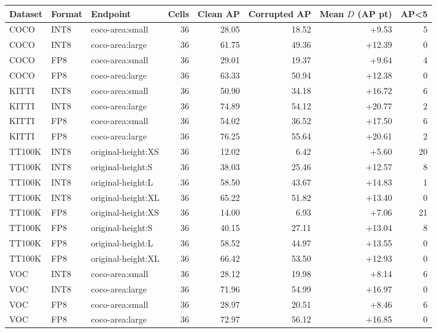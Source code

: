 \begin{tabular}{lllrrrrr}
\toprule
Dataset & Format & Endpoint & Cells & Clean AP & Corrupted AP & Mean $D$ (AP pt) & AP<5 \\
\midrule
COCO & INT8 & coco-area:small & 36 & 28.05 & 18.52 & +9.53 & 5 \\
COCO & INT8 & coco-area:large & 36 & 61.75 & 49.36 & +12.39 & 0 \\
COCO & FP8 & coco-area:small & 36 & 29.01 & 19.37 & +9.64 & 4 \\
COCO & FP8 & coco-area:large & 36 & 63.33 & 50.94 & +12.38 & 0 \\
KITTI & INT8 & coco-area:small & 36 & 50.90 & 34.18 & +16.72 & 6 \\
KITTI & INT8 & coco-area:large & 36 & 74.89 & 54.12 & +20.77 & 2 \\
KITTI & FP8 & coco-area:small & 36 & 54.02 & 36.52 & +17.50 & 6 \\
KITTI & FP8 & coco-area:large & 36 & 76.25 & 55.64 & +20.61 & 2 \\
TT100K & INT8 & original-height:XS & 36 & 12.02 & 6.42 & +5.60 & 20 \\
TT100K & INT8 & original-height:S & 36 & 38.03 & 25.46 & +12.57 & 8 \\
TT100K & INT8 & original-height:L & 36 & 58.50 & 43.67 & +14.83 & 1 \\
TT100K & INT8 & original-height:XL & 36 & 65.22 & 51.82 & +13.40 & 0 \\
TT100K & FP8 & original-height:XS & 36 & 14.00 & 6.93 & +7.06 & 21 \\
TT100K & FP8 & original-height:S & 36 & 40.15 & 27.11 & +13.04 & 8 \\
TT100K & FP8 & original-height:L & 36 & 58.52 & 44.97 & +13.55 & 0 \\
TT100K & FP8 & original-height:XL & 36 & 66.42 & 53.50 & +12.93 & 0 \\
VOC & INT8 & coco-area:small & 36 & 28.12 & 19.98 & +8.14 & 6 \\
VOC & INT8 & coco-area:large & 36 & 71.96 & 54.99 & +16.97 & 0 \\
VOC & FP8 & coco-area:small & 36 & 28.97 & 20.51 & +8.46 & 6 \\
VOC & FP8 & coco-area:large & 36 & 72.97 & 56.12 & +16.85 & 0 \\
\bottomrule
\end{tabular}
